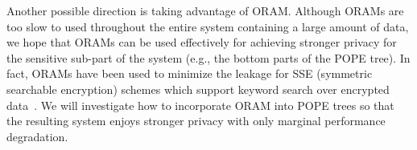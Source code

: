 


\iffalse
Another approach to reduce the leakage is leaving more ciphertexts in an
unsorted buffer (without affecting the performance significantly). 
In the original POPE construction, when an unsorted leaf buffer is full (i.e.,
containing more than $L$ ciphertexts), where $L$ is a threshold parameter, new
$L$ leaf nodes are created, and the ciphertexts are partitioned into $L$ newly
created buffers. This procedure greatly reduces the number of ciphertexts in
unsorted buffers and affects the security; in the worst case, some unsorted
buffer will have only a single ciphertext. With more careful split procedure,
we can maintain the reasonable number of ciphertexts even after the split.
\fi


Another possible direction is taking advantage of ORAM. Although ORAMs are too slow to used throughout the entire system
containing a large amount of data, we hope that ORAMs can be used effectively
for achieving stronger privacy for the sensitive sub-part of the system (e.g.,
the bottom parts of the POPE tree).  In fact, ORAMs have been used to minimize
the leakage for SSE (symmetric searchable encryption) schemes which support
keyword search over encrypted
data~\cite{NDSS:StePapShi14,C:GarMohPap16,RSA:IKLO16}. We will investigate how
to incorporate ORAM into POPE trees so that the resulting system enjoys
stronger privacy with only marginal performance degradation.  

